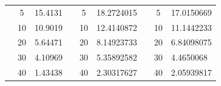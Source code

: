 \begin{table}[]
\begin{tabular}{|cclcclccl|}
\rowcolor[HTML]{DDFDFF} 
\multicolumn{1}{|c|}{\cellcolor[HTML]{FFFFC7}}                       & \multicolumn{1}{c|}{\cellcolor[HTML]{DDFDFF}5}         & \multicolumn{1}{l|}{\cellcolor[HTML]{DDFDFF}15.4131}    & \multicolumn{1}{c|}{\cellcolor[HTML]{FFFFC7}}                       & \multicolumn{1}{c|}{\cellcolor[HTML]{DDFDFF}5}         & \multicolumn{1}{l|}{\cellcolor[HTML]{DDFDFF}18.2724015} & \multicolumn{1}{c|}{\cellcolor[HTML]{FFFFC7}}                       & \multicolumn{1}{c|}{\cellcolor[HTML]{DDFDFF}5}         & 17.0150669 \\ \cline{2-3} \cline{5-6} \cline{8-9} 
\rowcolor[HTML]{DAE8FC} 
\multicolumn{1}{|c|}{\cellcolor[HTML]{FFFFC7}}                       & \multicolumn{1}{c|}{\cellcolor[HTML]{DAE8FC}10}        & \multicolumn{1}{l|}{\cellcolor[HTML]{DAE8FC}10.9019}    & \multicolumn{1}{c|}{\cellcolor[HTML]{FFFFC7}}                       & \multicolumn{1}{c|}{\cellcolor[HTML]{DAE8FC}10}        & \multicolumn{1}{l|}{\cellcolor[HTML]{DAE8FC}12.4140872} & \multicolumn{1}{c|}{\cellcolor[HTML]{FFFFC7}}                       & \multicolumn{1}{c|}{\cellcolor[HTML]{DAE8FC}10}        & 11.1442233 \\ \cline{2-3} \cline{5-6} \cline{8-9} 
\rowcolor[HTML]{DDFDFF} 
\multicolumn{1}{|c|}{\cellcolor[HTML]{FFFFC7}}                       & \multicolumn{1}{c|}{\cellcolor[HTML]{DDFDFF}20}        & \multicolumn{1}{l|}{\cellcolor[HTML]{DDFDFF}5.64471}    & \multicolumn{1}{c|}{\cellcolor[HTML]{FFFFC7}}                       & \multicolumn{1}{c|}{\cellcolor[HTML]{DDFDFF}20}        & \multicolumn{1}{l|}{\cellcolor[HTML]{DDFDFF}8.14923733} & \multicolumn{1}{c|}{\cellcolor[HTML]{FFFFC7}}                       & \multicolumn{1}{c|}{\cellcolor[HTML]{DDFDFF}20}        & 6.84098075 \\ \cline{2-3} \cline{5-6} \cline{8-9} 
\rowcolor[HTML]{DAE8FC} 
\multicolumn{1}{|c|}{\cellcolor[HTML]{FFFFC7}}                       & \multicolumn{1}{c|}{\cellcolor[HTML]{DAE8FC}30}        & \multicolumn{1}{l|}{\cellcolor[HTML]{DAE8FC}4.10969}    & \multicolumn{1}{c|}{\cellcolor[HTML]{FFFFC7}}                       & \multicolumn{1}{c|}{\cellcolor[HTML]{DAE8FC}30}        & \multicolumn{1}{l|}{\cellcolor[HTML]{DAE8FC}5.35892582} & \multicolumn{1}{c|}{\cellcolor[HTML]{FFFFC7}}                       & \multicolumn{1}{c|}{\cellcolor[HTML]{DAE8FC}30}        & 4.4650068  \\ \cline{2-3} \cline{5-6} \cline{8-9} 
\rowcolor[HTML]{DDFDFF} 
\multicolumn{1}{|c|}{\cellcolor[HTML]{FFFFC7}}                       & \multicolumn{1}{c|}{\cellcolor[HTML]{DDFDFF}40}        & \multicolumn{1}{l|}{\cellcolor[HTML]{DDFDFF}1.43438}    & \multicolumn{1}{c|}{\cellcolor[HTML]{FFFFC7}}                       & \multicolumn{1}{c|}{\cellcolor[HTML]{DDFDFF}40}        & \multicolumn{1}{l|}{\cellcolor[HTML]{DDFDFF}2.30317627} & \multicolumn{1}{c|}{\cellcolor[HTML]{FFFFC7}}                       & \multicolumn{1}{c|}{\cellcolor[HTML]{DDFDFF}40}        & 2.05939817 \\ \cline{2-3} \cline{5-6} \cline{8-9} 

\end{tabular}
\end{table}
